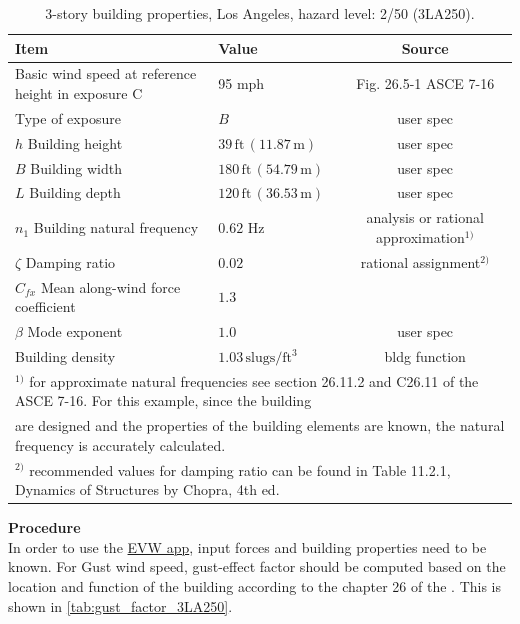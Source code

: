 \documentclass[onecolumn, fleqn]{article}
\newcommand{\ft}{\ensuremath{\,\mathrm{ft}}}
\newcommand{\m}{\ensuremath{\,\mathrm{m}}}
\begin{document}
\begin{table}[H]
\centering \caption{3-story building properties, Los Angeles, hazard level: 2/50 (3LA250).}
\label{tab:prop_3LA250}
\begin{tabular}{llc}
\toprule
Item		& Value		& Source		\\
\midrule
Basic wind speed at reference height in exposure C	& 95 mph						& Fig. 26.5-1 ASCE 7-16		\\
Type of exposure									& $B$							& user spec					\\
$h$ Building height									& $39\ft \,(11.87\m)$			& user spec					\\
$B$ Building width									& $180\ft \,(54.79\m)$			& user spec					\\
$L$ Building depth									& $120\ft \,(36.53\m)$			& user spec					\\
$n_1$ Building natural frequency					& $0.62$ Hz						& analysis or rational approximation$^{1)}$\\
$\zeta$ Damping ratio								& $0.02$						& rational assignment$^{2)}$		\\
$C_{fx}$ Mean along-wind force coefficient			& $1.3$							& 							\\
$\beta$ Mode exponent								& $1.0$							& user spec					\\
Building density									& $1.03 \,\mathrm{slugs/ft^3}$	& bldg function				\\
\bottomrule
\multicolumn{3}{l}{\footnotesize $^{1)}$ for approximate natural frequencies see section 26.11.2 and C26.11 of the ASCE 7-16. For this example, since the building}	\\
\multicolumn{3}{l}{\footnotesize \hspace{3mm} are designed and the properties of the building elements are known, the natural frequency is accurately calculated.}	\\
\multicolumn{3}{l}{\footnotesize $^{2)}$ recommended values for damping ratio can be found in Table 11.2.1, Dynamics of Structures by
Chopra, 4th ed. \citep{ChopraAnilK2012Dos}}
\end{tabular}
\end{table}

\noindent\textbf{Procedure}\\
In order to use the \href{https://simcenter.designsafe-ci.org/learning-tools/evw-application/}{EVW app}, input forces and building properties need to be known. For Gust wind speed, gust-effect factor should be computed based on the location and function of the building according to the chapter 26 of the \citet{asce7_2016}. This is shown in \cref{tab:gust_factor_3LA250}.
\end{document}
